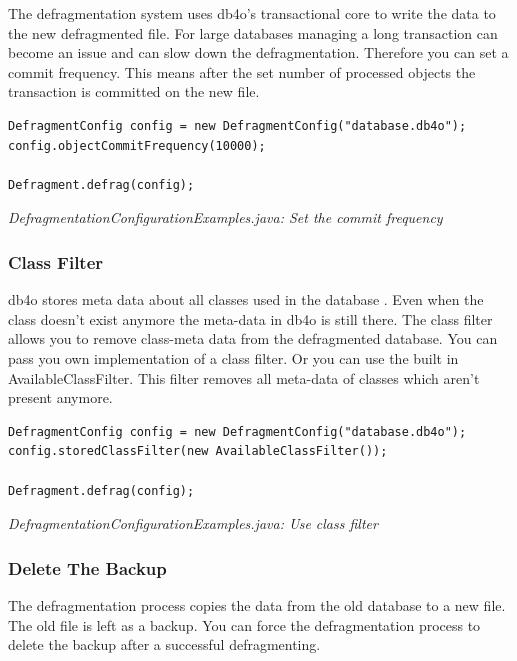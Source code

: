 The defragmentation system uses db4o's transactional core to write the data to the new defragmented file. For large databases managing a long transaction can become an issue and can slow down the defragmentation. Therefore you can set a commit frequency. This means after the set number of processed objects the transaction is committed on the new file.

\begin{lstlisting}
DefragmentConfig config = new DefragmentConfig("database.db4o");
config.objectCommitFrequency(10000);

Defragment.defrag(config);
\end{lstlisting}

{\small\itshape DefragmentationConfigurationExamples.java: Set the commit frequency\par}
\medskip

\subsubsection{Class Filter}
\label{ref:advanced-topics-defragment-configuration-class-filter}

db4o stores meta data about all classes used in the database . Even when the class doesn't exist anymore the meta-data in db4o is still there. The class filter allows you to remove class-meta data from the defragmented database. You can pass you own implementation of a class filter. Or you can use the built in AvailableClassFilter. This filter removes all meta-data of classes which aren't present anymore.

\begin{lstlisting}
DefragmentConfig config = new DefragmentConfig("database.db4o");
config.storedClassFilter(new AvailableClassFilter());

Defragment.defrag(config);
\end{lstlisting}

{\small\itshape DefragmentationConfigurationExamples.java: Use class filter\par}
\medskip

\subsubsection{Delete The Backup}
\label{ref:advanced-topics-defragment-configuration-delete-backup}

The defragmentation process copies the data from the old database to a new file. The old file is left as a backup. You can force the defragmentation process to delete the backup after a successful defragmenting.

